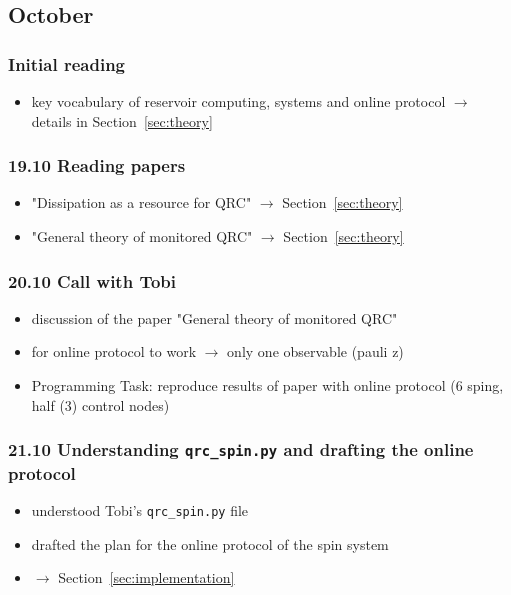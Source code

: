 \subsection*{October}

\subsubsection*{Initial reading}
\begin{itemize}
    \item key vocabulary of reservoir computing, systems and online protocol $\to$ details in Section~\ref{sec:theory}
\end{itemize}

\subsubsection*{19.10 \quad Reading papers}
\begin{itemize}
    \item "Dissipation as a resource for QRC" $\to$ Section~\ref{sec:theory}
    \item "General theory of monitored QRC" $\to$ Section~\ref{sec:theory}
\end{itemize}

\subsubsection*{20.10 \quad Call with Tobi}
\begin{itemize}
    \item discussion of the paper "General theory of monitored QRC"
    \item for online protocol to work $\to$ only one observable (pauli z)
    \item Programming Task: reproduce results of paper with online protocol (6 sping, half (3) control nodes)
\end{itemize}

\subsubsection*{21.10 \quad Understanding \texttt{qrc\_spin.py} and drafting the online protocol}
\begin{itemize}
    \item understood Tobi's \texttt{qrc\_spin.py} file
    \item drafted the plan for the online protocol of the spin system
    \item $\to$ Section~\ref{sec:implementation}
\end{itemize}

